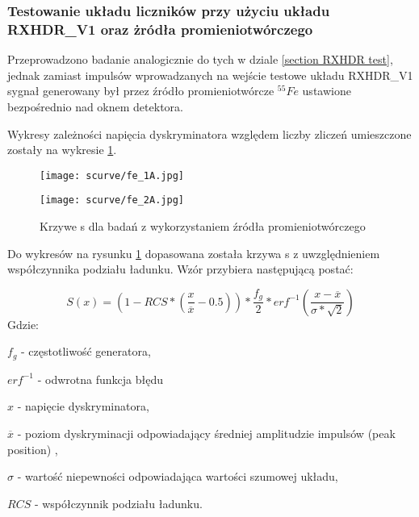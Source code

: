 \subsubsection{Testowanie układu liczników przy użyciu układu RXHDR\_V1 oraz żródła promieniotwórczego}
\label{section RXHDR fe}

Przeprowadzono badanie analogicznie do tych w dziale \ref{section RXHDR test}, jednak zamiast impulsów wprowadzanych na wejście testowe układu RXHDR\_V1 sygnał generowany był przez źródło promieniotwórcze ${}^{55}Fe$ ustawione bezpośrednio nad oknem detektora. 

Wykresy zależności napięcia dyskryminatora względem liczby zliczeń umieszczone zostały na wykresie \ref{s curve fe}. 

\begin{figure}[]
        \centering
        \begin{multicols}{2}
                \texttt{[image: scurve/fe\_1A.jpg]} \par
                \texttt{[image: scurve/fe\_2A.jpg]} \par
                
        \end{multicols}
        \caption{Krzywe s dla badań z wykorzystaniem źródła promieniotwórczego}
        \label{s curve fe}
\end{figure}

Do wykresów na rysunku \ref{s curve fe} dopasowana została krzywa s z uwzględnieniem współczynnika podziału ładunku. Wzór przybiera następującą postać:

\begin{equation}
        \label{test eq}
        S(x) = (1-RCS * (\frac{x}{\overline{x}}-0.5)) * \frac{f_g}{2} * erf^{-1}(\frac{x-\overline{x}}{\sigma*\sqrt{2}})
\end{equation}
Gdzie:
\begin{description}
        \item $f_g$ - częstotliwość generatora,
        \item $erf^{-1}$ - odwrotna funkcja błędu
        \item $x$ - napięcie dyskryminatora,
        \item $\overline{x}$ - poziom dyskryminacji odpowiadający średniej amplitudzie impulsów (peak position) ,
        \item  $\sigma$ - wartość niepewności odpowiadająca wartości szumowej układu,
        \item $RCS$ -  współczynnik podziału ładunku.
\end{description}

